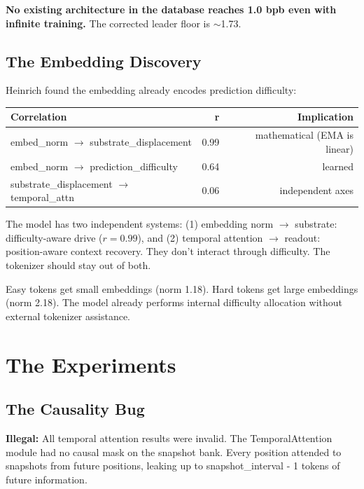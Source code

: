 \documentclass[11pt,a4paper]{report}
\newcommand{\illegal}[1]{\textcolor{illegal}{\textbf{Illegal:}} #1}
\begin{document}
\textbf{No existing architecture in the database reaches 1.0 bpb even with infinite training.} The corrected leader floor is $\sim$1.73.


\chapter{The Embedding Discovery}

Heinrich found the embedding already encodes prediction difficulty:

\begin{table}[h]
\centering
\begin{tabular}{lrr}
\toprule
\textbf{Correlation} & \textbf{r} & \textbf{Implication} \\
\midrule
embed\_norm $\to$ substrate\_displacement & 0.99 & mathematical (EMA is linear) \\
embed\_norm $\to$ prediction\_difficulty & 0.64 & learned \\
substrate\_displacement $\to$ temporal\_attn & 0.06 & independent axes \\
\bottomrule
\end{tabular}
\end{table}

The model has two independent systems: (1) embedding norm $\to$ substrate: difficulty-aware drive ($r=0.99$), and (2) temporal attention $\to$ readout: position-aware context recovery. They don't interact through difficulty. The tokenizer should stay out of both.

Easy tokens get small embeddings (norm 1.18). Hard tokens get large embeddings (norm 2.18). The model already performs internal difficulty allocation without external tokenizer assistance.


\part{The Experiments}

\chapter{The Causality Bug}

\illegal{All temporal attention results were invalid. The TemporalAttention module had no causal mask on the snapshot bank. Every position attended to snapshots from future positions, leaking up to snapshot\_interval - 1 tokens of future information.}
\end{document}
